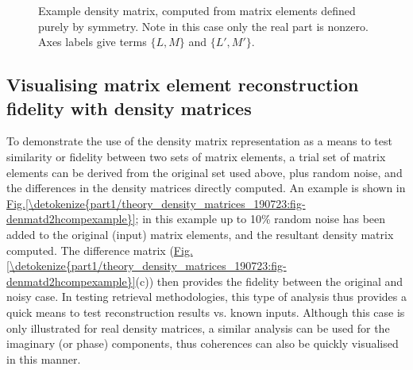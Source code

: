 \documentclass[letterpaper,table,10pt,english]{jupyterBook}
\begin{document}
\begin{figure}[htbp]
\centering
\capstart

\noindent{}
\caption{Example density matrix, computed from matrix elements defined purely by  symmetry. Note in this case only the real part is non\sphinxhyphen{}zero. Axes labels give terms \(\{L,M\}\) and \(\{L',M'\}\).}\label{\detokenize{part1/theory_density_matrices_190723:fig-denmatd2hrealonly}}\end{figure}


\subsection{Visualising matrix element reconstruction fidelity with density matrices}
\label{\detokenize{part1/theory_density_matrices_190723:visualising-matrix-element-reconstruction-fidelity-with-density-matrices}}
\sphinxAtStartPar
To demonstrate the use of the density matrix representation as a means to test similarity or fidelity between two sets of matrix elements, a trial set of matrix elements can be derived from the original set used above, plus random noise, and the differences in the density matrices directly computed. An example is shown in \hyperref[\detokenize{part1/theory_density_matrices_190723:fig-denmatd2hcompexample}]{Fig.\@ \ref{\detokenize{part1/theory_density_matrices_190723:fig-denmatd2hcompexample}}}; in this example up to 10\% random noise has been added to the original (input) matrix elements, and the resultant density matrix computed. The difference matrix (\hyperref[\detokenize{part1/theory_density_matrices_190723:fig-denmatd2hcompexample}]{Fig.\@ \ref{\detokenize{part1/theory_density_matrices_190723:fig-denmatd2hcompexample}}}(c)) then provides the fidelity between the original and noisy case. In testing retrieval methodologies, this type of analysis thus provides a quick means to test reconstruction results vs. known inputs. Although this case is only illustrated for real density matrices, a similar analysis can be used for the imaginary (or phase) components, thus coherences can also be quickly visualised in this manner.
\end{document}
